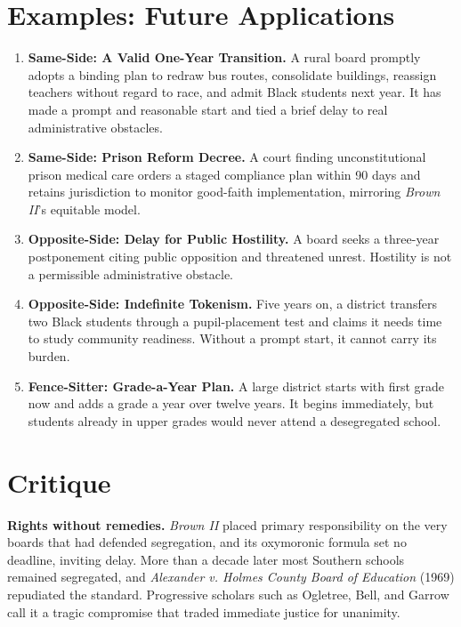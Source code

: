 \documentclass[12pt]{article}
\begin{document}
\section{Examples: Future Applications}

\begin{enumerate}
\item \textbf{Same-Side: A Valid One-Year Transition.} A rural board promptly adopts a binding plan to redraw bus routes, consolidate buildings, reassign teachers without regard to race, and admit Black students next year. It has made a prompt and reasonable start and tied a brief delay to real administrative obstacles.
\item \textbf{Same-Side: Prison Reform Decree.} A court finding unconstitutional prison medical care orders a staged compliance plan within 90 days and retains jurisdiction to monitor good-faith implementation, mirroring \textit{Brown II}'s equitable model.
\item \textbf{Opposite-Side: Delay for Public Hostility.} A board seeks a three-year postponement citing public opposition and threatened unrest. Hostility is not a permissible administrative obstacle.
\item \textbf{Opposite-Side: Indefinite Tokenism.} Five years on, a district transfers two Black students through a pupil-placement test and claims it needs time to study community readiness. Without a prompt start, it cannot carry its burden.
\item \textbf{Fence-Sitter: Grade-a-Year Plan.} A large district starts with first grade now and adds a grade a year over twelve years. It begins immediately, but students already in upper grades would never attend a desegregated school.
\end{enumerate}

\section{Critique}

\textbf{Rights without remedies.} \textit{Brown II} placed primary responsibility on the very boards that had defended segregation, and its oxymoronic formula set no deadline, inviting delay. More than a decade later most Southern schools remained segregated, and \textit{Alexander v. Holmes County Board of Education} (1969) repudiated the standard. Progressive scholars such as Ogletree, Bell, and Garrow call it a tragic compromise that traded immediate justice for unanimity.
\end{document}
